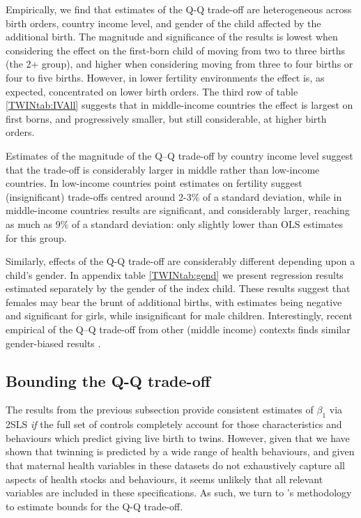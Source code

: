 \documentclass[subeqn]{article}
\begin{document}
\begin{spacing}{1.4}
Empirically, we find that estimates of the Q-Q trade-off are heterogeneous 
across birth orders, country income level, and gender of the child affected by 
the additional birth.  The magnitude and significance of the results is lowest 
when considering the effect on the first-born child of moving from two to three 
births (the 2+ group), and higher when considering moving from three to four 
births or four to five births. However, in lower fertility environments the 
effect is, as expected, concentrated on lower birth orders. The third row of 
table \ref{TWINtab:IVAll} suggests that in middle-income countries the effect is 
largest on first borns, and progressively smaller, but still considerable, at 
higher birth orders.

Estimates of the magnitude of the Q--Q trade-off by country income level suggest 
that the trade-off is considerably larger in middle rather than low-income 
countries. In low-income countries point estimates on fertility suggest 
(insignificant) trade-offs centred around 2-3\% of a standard deviation, while in 
middle-income countries results are significant, and considerably larger,
reaching as much as 9\% of a standard deviation: only slightly lower than OLS 
estimates for this group.

Similarly, effects of the Q-Q trade-off are considerably different depending upon 
a child's gender. In appendix table \ref{TWINtab:gend} we present regression 
results estimated separately by the gender of the index child. These results 
suggest that females may bear the brunt of additional births, with estimates
being negative and significant for girls, while insignificant for male children. 
Interestingly, recent empirical of the Q--Q trade-off from other (middle income)
contexts finds similar gender-biased results \citep{SouzaPonczek2012}.



\subsection{Bounding the Q-Q trade-off}            \label{TWINsscn:resultBounds}
The results from the previous subsection provide consistent estimates of 
$\beta_1$ via 2SLS \emph{if} the full set of controls completely account for 
those characteristics and behaviours which predict giving live birth to twins. 
However, given that we have shown that twinning is predicted by a wide range of 
health behaviours, and given that maternal health variables in these datasets 
do not exhaustively capture all aspects of health stocks and behaviours, it 
seems unlikely that all relevant variables are included in these specifications. 
As such, we turn to \citeauthor{Conleyetal2012}'s \citeyear{Conleyetal2012} 
methodology to estimate bounds for the Q-Q trade-off.  


\end{spacing}
\end{document}

